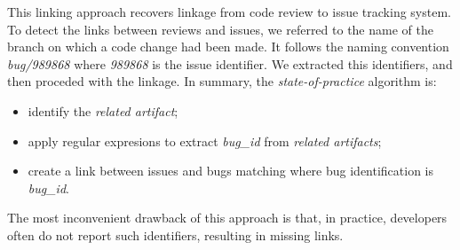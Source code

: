 \documentclass[conference,compsoc]{IEEEtran}
\begin{document}
This linking approach recovers linkage from code review to issue tracking system. 
To detect the links between reviews and issues, we referred to the name of 
the branch on which a code change had been made. It follows the naming convention 
\emph{bug/989868} where \emph{989868} is the issue identifier. 
We extracted this identifiers, and then proceded with the linkage. 
In summary, the \emph{state-of-practice} algorithm is:
\\
\begin{itemize}

\item identify the \emph{related artifact};

\item apply regular expresions to extract \emph{bug\_id} from \emph{related artifacts};

\item create a link between issues and bugs matching where bug identification is \emph{bug\_id}.

\end{itemize}

The most inconvenient drawback of this approach is that, in practice, developers often 
do not report such identifiers, resulting in missing links.
\end{document}
